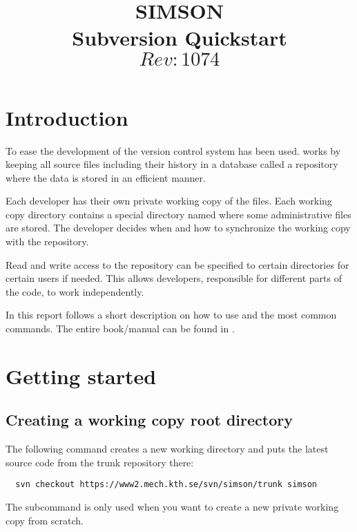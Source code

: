 \documentclass[10pt,a4paper]{simson}
\title{\textbf{SIMSON}\\Subversion Quickstart\\ $Rev: 1074 $}
\author{}
\begin{document}
\maketitle

\tableofcontents*


\chapter{Introduction}
\setcounter{page}{1} To ease the development of
 the version control system  has been
used.  works by keeping all source files including
their history in a database called a repository where the data is
stored in an efficient manner.

Each developer has their own private working copy of the files. Each
working copy directory contains a special directory named 
where some administrative files are stored. The developer decides when
and how to synchronize the working copy with the repository.

Read and write access to the repository can be specified to certain
directories for certain users if needed. This allows developers,
responsible for different parts of the code, to work independently.

In this report follows a short description on how to use
 and the most common commands. The entire
 book/manual can be found in \cite{svn-book}.


\chapter{Getting started}

\section{Creating a working copy root directory}
The following command creates a new working directory 
and puts the latest source code from the  trunk
repository there:
\begin{verbatim}
  svn checkout https://www2.mech.kth.se/svn/simson/trunk simson
\end{verbatim}
The  subcommand is only used when you want to
create a new private working copy from scratch.
\end{document}
